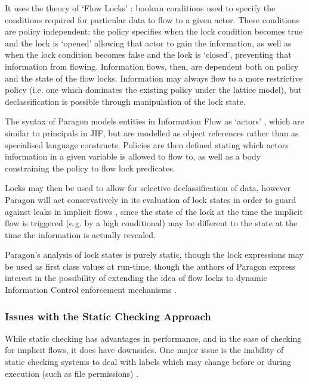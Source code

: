 It uses the theory of `Flow Locks' \cite{broberg2010paralocks}: boolean conditions used to specify the conditions required for particular data to flow to a given actor. These conditions are policy independent: the policy specifies when the lock condition becomes true and the lock is `opened' allowing that actor to gain the information, as well as when the lock condition becomes false and the lock is `closed', preventing that information from flowing. Information flows, then, are dependent both on policy and the state of the flow locks. Information may always flow to a more restrictive policy (i.e. one which dominates the existing policy under the lattice model), but declassification is possible through manipulation of the lock state.

The syntax of Paragon models entities in Information Flow as `actors' \cite{broberg2013paragon}, which are similar to principals in JIF, but are modelled as object references rather than as specialised language constructs. Policies are then defined stating which actors information in a given variable is allowed to flow to, as well as a body constraining the policy to flow lock predicates.

Locks may then be used to allow for selective declassification of data, however Paragon will act conservatively in its evaluation of lock states in order to guard against leaks in implicit flows \cite{broberg2013paragon}, since the state of the lock at the time the implicit flow is triggered (e.g. by a high conditional) may be different to the state at the time the information is actually revealed.

Paragon's analysis of lock states is purely static, though the lock expressions may be used as first class values at run-time, though the authors of Paragon express interest in the possibility of extending the idea of flow locks to dynamic Information Control enforcement mechanisms \cite{broberg2013paragon}.

\subsubsection{Issues with the Static Checking Approach}

While static checking has advantages in performance, and in the ease of checking for implicit flows, it does have downsides. One major issue is the inability of static checking systems to deal with labels which may change before or during execution (such as file permissions) \cite{sabelfeld2003if}.

